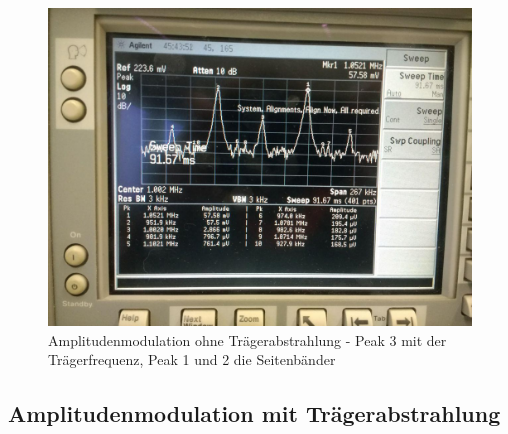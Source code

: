 \begin{figure}
	\centering
	\includegraphics[width=\textwidth]{img/Aufgabenteil_b.jpg}
	\caption{Amplitudenmodulation ohne Trägerabstrahlung - Peak 3 mit der Trägerfrequenz, Peak 1 und 2 die Seitenbänder}
	\label{b}
\end{figure}

\subsection{Amplitudenmodulation mit Tr\"{a}gerabstrahlung}

